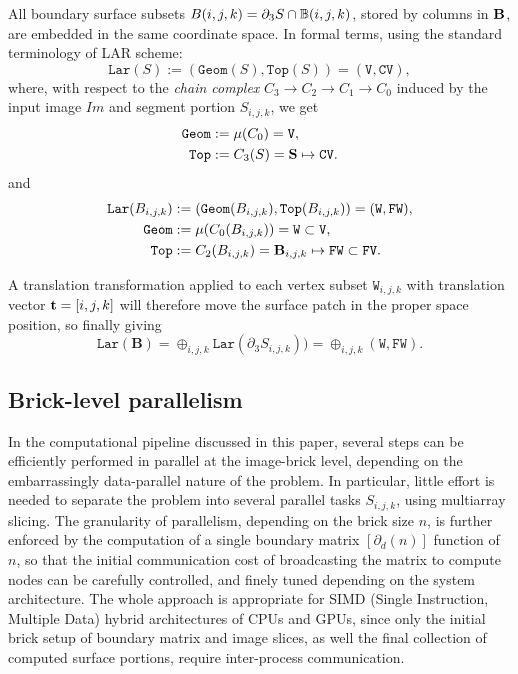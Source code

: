 All boundary surface subsets $B(i,j,k) = \partial_3 S \cap \mathbb{B}(i,j,k)$, stored by  columns in ${\bf B}$, are embedded in the same coordinate space. In formal terms, using the standard terminology of LAR scheme: 
\[
\texttt{Lar}(S) := (\texttt{Geom}(S), \texttt{Top}(S)) = (\texttt{V}, \texttt{CV}),
\]
where, with respect to the \emph{chain complex} $C_3\to C_2\to C_1\to C_0$ induced by the input image $Im$ and segment portion $S_{i,j,k}$, we get
\begin{align}
\texttt{Geom} &:= \mu(C_0) = \texttt{V},
\\
\texttt{Top} &:= C_3(S) = {\bf S} \mapsto \texttt{CV}.
\end{align}
and
\begin{align}
\texttt{Lar}(B_{i,j,k}) &:= (\texttt{Geom}(B_{i,j,k}), \texttt{Top}(B_{i,j,k})) = (\texttt{W}, \texttt{FW}),
\\
\texttt{Geom} &:= \mu(C_0(B_{i,j,k})) = \texttt{W} \subset \texttt{V},
\\
\texttt{Top} &:= C_2(B_{i,j,k}) = {\bf \textbf{B}}_{i,j,k} \mapsto \texttt{FW} \subset \texttt{FV}.
\end{align}


A translation transformation applied to each vertex subset $\texttt{W}_{i,j,k}$ with translation  vector ${\bf t} = [i,j,k]$ will therefore move the surface patch in the proper space position, so finally giving
\[
\texttt{Lar}(\textbf{B}) = \oplus_{i,j,k}\texttt{Lar}(\partial_3 S_{i,j,k})) = \oplus_{i,j,k}(\texttt{W}, \texttt{FW}) .
\]


\subsection{Brick-level parallelism}\label{sec:brick-parallelism}
In the computational pipeline discussed in this paper, several steps can be efficiently performed in parallel at the image-brick level, depending on the embarrassingly data-parallel nature of the problem. In particular, little effort is needed to separate the problem into several  parallel tasks $S_{i,j,k}$, using multiarray slicing. The granularity of parallelism, depending on the brick size $n$, is further enforced by the computation of a single boundary matrix $[\partial_d(n)]$ function of $n$, so that the initial communication cost of broadcasting the matrix to compute nodes can be carefully controlled, and finely tuned depending on the system architecture. The whole approach is appropriate  for SIMD (Single Instruction, Multiple Data) hybrid architectures of CPUs and GPUs, since only the initial brick setup of boundary matrix and image slices, as well the final collection of computed surface portions, require inter-process communication.